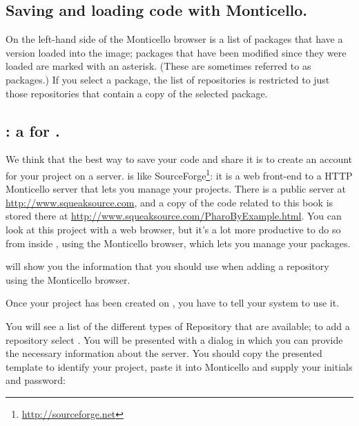 \documentclass[a4paper,10pt,twoside]{book}
\begin{document}
{{\subsection{Saving and loading code with Monticello.}
On the left-hand side of the Monticello browser is a list of packages that have a version loaded into the image; packages that have been modified since they were loaded are marked with an asterisk.  (These are sometimes referred to as  packages.)  If you select a package, the list of repositories is restricted to just those repositories that contain a copy of the selected package.



\subsection{\ind{\sqsrc}: a  for \pharo.} 
We think that the best way to save your code and share it is to create an account for your project on a \sqsrc server. 
\sqsrc is like SourceForge\footnote{\url{http://sourceforge.net}}: it is a web front-end to a HTTP Monticello server that lets you manage your projects.
There is a public \sqsrc server at \url{http://www.squeaksource.com}, and a copy of the code related to this book is stored there at \url{http://www.squeaksource.com/PharoByExample.html}. You can look at this project with a web browser, but it's a lot more productive to do so from inside \pharo, using the Monticello browser, which lets you manage your packages.

\sqsrc will show you the information that you should use when adding a repository using the Monticello browser. 

Once your project has been created on \sqsrc, you have to tell your \pharo system to use it. 

  You will see a list of the different types of Repository that are available; to add a \sqsrc repository select . You will be presented with a dialog in which you can provide the necessary information about the server.
You should copy the presented template to identify your \sqsrc project, paste it into Monticello and supply your initials and password:

}}
\end{document}
